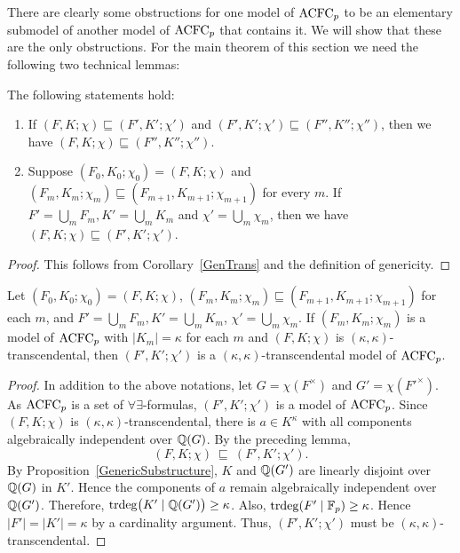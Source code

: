 \noindent
There are clearly some obstructions for one model of $\mathrm{ACFC}_p$  to be an elementary submodel of another model of $\mathrm{ACFC}_p$ that contains it. We will show that these are the only obstructions. For the main theorem of this section we need the following two technical lemmas:






\begin{lem} The following statements hold:
\begin{enumerate}
\item If $(F, K;\chi) \sqsubseteq (F', K';\chi')$ and $ (F', K';\chi') \sqsubseteq (F'', K'';\chi'')$, then we have $(F, K;\chi) \sqsubseteq (F'', K'';\chi'')$.
\item Suppose $ (F_0, K_0;\chi_0) = (F, K; \chi)$ and $ (F_m, K_m;\chi_m) \sqsubseteq (F_{m+1}, K_{m+1};\chi_{m+1})$ for every $m$. If \(F' = \bigcup_m F_m, K' = \bigcup_m K_m \) and $\chi' = \bigcup_m \chi_m $, then we have $(F, K;\chi) \sqsubseteq (F', K';\chi')$.
\end{enumerate}
\end{lem}

\begin{proof}
This follows from Corollary~\ref{GenTrans} and the definition of genericity.
\end{proof}

\begin{lem}
Let $ (F_0, K_0;\chi_0) = (F, K; \chi)$, $ (F_m, K_m;\chi_m) \sqsubseteq (F_{m+1}, K_{m+1};\chi_{m+1})$ for each $m$, and \(F' = \bigcup_m F_m, K' = \bigcup_m K_m \), $\chi' = \bigcup_m \chi_m $. If $(F_m, K_m;\chi_m)$ is a model of $\mathrm{ACFC}_p$ with $|K_m| =\kappa$ for each $m$ and $(F, K; \chi)$
 is $(\kappa, \kappa)$-transcendental, then $ ( F', K'; \chi')$ is a $(\kappa, \kappa)$-transcendental model of $\mathrm{ACFC}_p$. 
\end{lem}

\begin{proof}
In addition to the above notations, let $G = \chi( F^\times)$ and $G' = \chi( {F'}^\times)$. As $\mathrm{ACFC}_p$  is a set of $\forall\exists$-formulas,  $(F', K'; \chi')$ is a model of $\mathrm{ACFC}_p$.  
Since $ (F, K; \chi)$ is $(\kappa,\kappa)$-transcendental, there is $a \in K^\kappa$ with all components algebraically independent over $\mathbb{Q}(G)$. 
By the preceding lemma, $$ (F, K; \chi)\ \sqsubseteq\ (F', K'; \chi').$$
By Proposition~\ref{GenericSubstructure}, $K $ and $ \mathbb{Q}(G')$ are linearly disjoint over $ \mathbb{Q}(G)$ in $K'$.
Hence the components of $a$ remain algebraically independent over $\mathbb{Q}(G')$. Therefore, $\mathrm{trdeg}\big(K' \mid  \mathbb{Q}(G')\big) \geq \kappa$.
Also, $\mathrm{trdeg}(F' \mid \mathbb{F}_p) \geq  \kappa$.
Hence $|F'|=|K'|= \kappa$ by a cardinality argument. 
Thus, $ ( F', K'; \chi')$  must be $(\kappa, \kappa)$-transcendental.
\end{proof}

